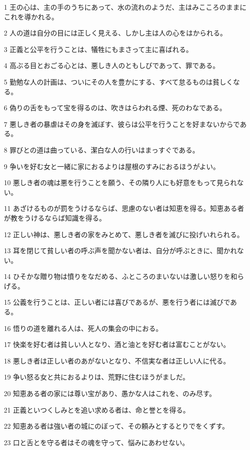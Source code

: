 \par 1 王の心は、主の手のうちにあって、水の流れのようだ、主はみこころのままにこれを導かれる。
\par 2 人の道は自分の目には正しく見える、しかし主は人の心をはかられる。
\par 3 正義と公平を行うことは、犠牲にもまさって主に喜ばれる。
\par 4 高ぶる目とおごる心とは、悪しき人のともしびであって、罪である。
\par 5 勤勉な人の計画は、ついにその人を豊かにする、すべて怠るものは貧しくなる。
\par 6 偽りの舌をもって宝を得るのは、吹きはらわれる煙、死のわなである。
\par 7 悪しき者の暴虐はその身を滅ぼす、彼らは公平を行うことを好まないからである。
\par 8 罪びとの道は曲っている、潔白な人の行いはまっすぐである。
\par 9 争いを好む女と一緒に家におるよりは屋根のすみにおるほうがよい。
\par 10 悪しき者の魂は悪を行うことを願う、その隣り人にも好意をもって見られない。
\par 11 あざけるものが罰をうけるならば、思慮のない者は知恵を得る。知恵ある者が教をうけるならば知識を得る。
\par 12 正しい神は、悪しき者の家をみとめて、悪しき者を滅びに投げいれられる。
\par 13 耳を閉じて貧しい者の呼ぶ声を聞かない者は、自分が呼ぶときに、聞かれない。
\par 14 ひそかな贈り物は憤りをなだめる、ふところのまいないは激しい怒りを和らげる。
\par 15 公義を行うことは、正しい者には喜びであるが、悪を行う者には滅びである。
\par 16 悟りの道を離れる人は、死人の集会の中におる。
\par 17 快楽を好む者は貧しい人となり、酒と油とを好む者は富むことがない。
\par 18 悪しき者は正しい者のあがないとなり、不信実な者は正しい人に代る。
\par 19 争い怒る女と共におるよりは、荒野に住むほうがましだ。
\par 20 知恵ある者の家には尊い宝があり、愚かな人はこれを、のみ尽す。
\par 21 正義といつくしみとを追い求める者は、命と誉とを得る。
\par 22 知恵ある者は強い者の城にのぼって、その頼みとするとりでをくずす。
\par 23 口と舌とを守る者はその魂を守って、悩みにあわせない。
